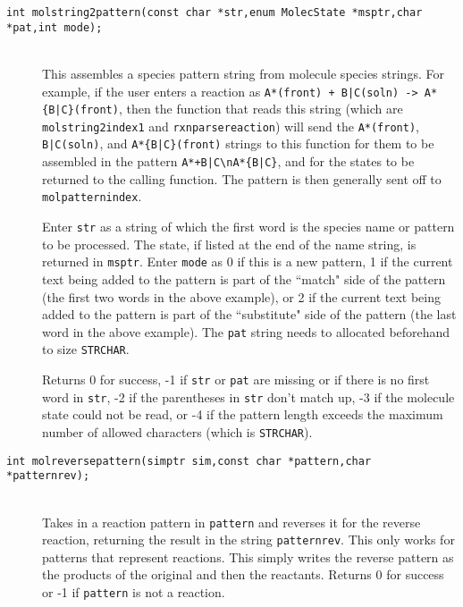 \documentclass {book}
\begin{document}
\begin{description}
\item[\texttt{int molstring2pattern(const char *str,enum MolecState *msptr,char *pat,int mode);}]
\hfill \\
This assembles a species pattern string from molecule species strings. For example, if the user enters a reaction as \texttt{A*(front) + B|C(soln) -> A*\{B|C\}(front)}, then the function that reads this string (which are \texttt{molstring2index1} and \texttt{rxnparsereaction}) will send the \texttt{A*(front)}, \texttt{B|C(soln)}, and \texttt{A*\{B|C\}(front)} strings to this function for them to be assembled in the pattern \texttt{A*+B|C\textbackslash nA*\{B|C\}}, and for the states to be returned to the calling function. The pattern is then generally sent off to \texttt{molpatternindex}.

Enter \texttt{str} as a string of which the first word is the species name or pattern to be processed. The state, if listed at the end of the name string, is returned in \texttt{msptr}. Enter \texttt{mode} as 0 if this is a new pattern, 1 if the current text being added to the pattern is part of the ``match" side of the pattern (the first two words in the above example), or 2 if the current text being added to the pattern is part of the ``substitute" side of the pattern (the last word in the above example). The \texttt{pat} string needs to allocated beforehand to size \texttt{STRCHAR}.

Returns 0 for success, -1 if \texttt{str} or \texttt{pat} are missing or if there is no first word in \texttt{str}, -2 if the parentheses in \texttt{str} don't match up, -3 if the molecule state could not be read, or -4 if the pattern length exceeds the maximum number of allowed characters (which is \texttt{STRCHAR}).

\item[\texttt{int molreversepattern(simptr sim,const char *pattern,char *patternrev);}]
\hfill \\
Takes in a reaction pattern in \texttt{pattern} and reverses it for the reverse reaction, returning the result in the string \texttt{patternrev}. This only works for patterns that represent reactions. This simply writes the reverse pattern as the products of the original and then the reactants. Returns 0 for success or -1 if \texttt{pattern} is not a reaction.


\end{description}
\end{document}
